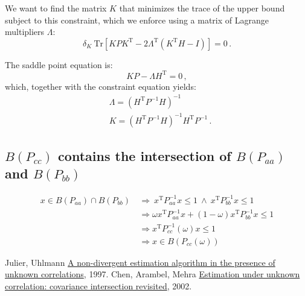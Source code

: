 \documentclass[11pt]{article}
\newcommand{\Tr}[1]{\mathrm{Tr}\left[{#1}\right]}
\newcommand{\transpose}{\mathrm{\scriptscriptstyle T}}
\begin{document}
We want to find the matrix $K$ that minimizes the trace of the upper bound
subject to this constraint, which we enforce using a matrix of Lagrange
multipliers $\Lambda$:
\begin{equation}
    \delta_K\ \Tr{KPK^\transpose - 2\Lambda^\transpose(K^\transpose H - I)} = 0\,.
\end{equation}

The saddle point equation is:
\begin{equation}
    KP - \Lambda H^\transpose = 0\,,
\end{equation}
which, together with the constraint equation yields:
\begin{align}
    &\Lambda = (H^\transpose P^{-1} H)^{-1} \\
    &K = (H^\transpose P^{-1} H)^{-1}H^\transpose P^{-1}\,.
\end{align}

\subsection{$B(P_{cc})$ contains the intersection of $B(P_{aa})$ and $B(P_{bb})$}
\label{proof_pcc_contains_intersection}

\begin{align}
    x \in B(P_{aa}) \cap B(P_{bb})\ &\Rightarrow\ x^\transpose P_{aa}^{-1}x \leq 1\ \land\ x^\transpose P_{bb}^{-1}x \leq 1\\
    &\Rightarrow \omega x^\transpose P_{aa}^{-1}x + (1-\omega) x^\transpose P_{bb}^{-1}x \leq 1\\
    &\Rightarrow x^\transpose P_{cc}^{-1}(\omega)x\leq 1\\
    &\Rightarrow x \in B(P_{cc}(\omega))
\end{align}


\begin{thebibliography}{9}
  Julier, Uhlmann
  \href{https://ieeexplore.ieee.org/iel3/4827/13338/00609105.pdf?casa_token=xmJ8y10BkucAAAAA:hHlQdYE1oL_zSZcqsOhZsctM8oaW9GocGzfjueZ5rj87BNId508xUH_bAQHqK1ncbRNzYZi4}{A non-divergent estimation algorithm in the presence of unknown correlations}, 
  1997.
  Chen, Arambel, Mehra
  \href{https://ieeexplore.ieee.org/document/1047015}{Estimation under unknown correlation: covariance intersection revisited}, 
  2002.
\end{thebibliography}
\end{document}
